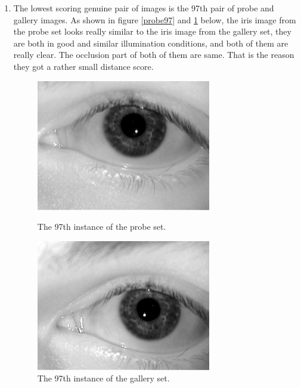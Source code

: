 \documentclass[a4paper]{article}
\begin{document}
\begin{spacing}{2.0}
\begin{enumerate}
	\item The lowest scoring genuine pair of images is the 97th pair of probe and gallery images. As shown in figure \ref{probe97} and \ref{gallery97} below, the iris image from the probe set looks really similar to the iris image from the gallery set, they are both in good and similar illumination conditions, and both of them are really clear. The occlusion part of both of them are same. That is the reason they got a rather small distance score.
	\begin{figure}[H]
	\begin{minipage}[t]{0.5\linewidth}
	\centering
	\includegraphics[width = 3in]{probe97.jpg}
	\caption{The 97th instance of the probe set.}
	\label{probe97}
	\end{minipage}
	\begin{minipage}[t]{0.5\linewidth}
	\centering
	\includegraphics[width = 3in]{gallery97.jpg}
	\caption{The 97th instance of the gallery set.}
	\label{gallery97}
	\end{minipage}
	\end{figure}
	

\end{enumerate}
\end{spacing}
\end{document}
